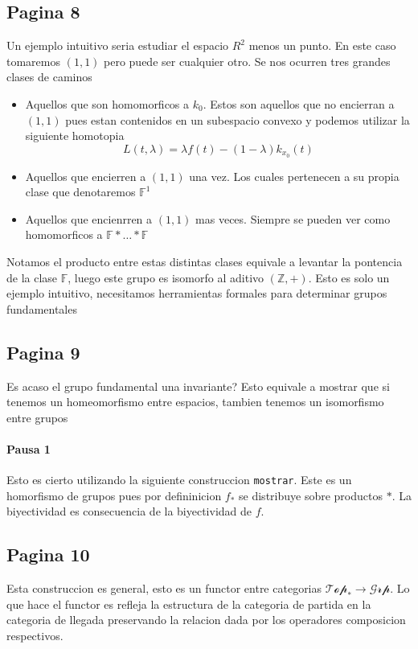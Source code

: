 \documentclass[letterpaper]{article}
\begin{document}
\subsection*{Pagina 8}
Un ejemplo intuitivo seria estudiar el espacio \(R^2\) menos un punto.
En este caso tomaremos \((1,1)\) pero puede ser cualquier otro. Se nos
ocurren tres grandes clases de caminos
\begin{itemize}
\item Aquellos que son homomorficos a \(k_0\). Estos son aquellos que no
  encierran a \((1,1)\) pues estan contenidos en un subespacio convexo y
  podemos utilizar la siguiente homotopia
  \[ L (t,\lambda) = \lambda f (t) - (1 - \lambda) k_{x_0} (t)\]
\item Aquellos que encierren a \((1,1)\) una vez. Los cuales pertenecen
  a su propia clase que denotaremos \(\mathbb F ^1\)
\item Aquellos que encienrren a \((1,1)\) mas veces. Siempre se pueden
  ver como homomorficos a \(\mathbb F * \dots * \mathbb F \)
\end{itemize}
Notamos el producto entre estas distintas clases equivale a levantar la
pontencia de la clase \(\mathbb F\), luego este grupo es isomorfo al
aditivo \((\mathbb Z , +)\). Esto es solo un ejemplo intuitivo,
necesitamos herramientas formales para determinar grupos fundamentales

\subsection*{Pagina 9}
Es acaso el grupo fundamental una invariante? Esto equivale a mostrar
que si tenemos un homeomorfismo entre espacios, tambien tenemos un
isomorfismo entre grupos

\paragraph{Pausa 1}
Esto es cierto utilizando la siguiente construccion \texttt{mostrar}.
Este es un homorfismo de grupos pues por defininicion \(f_*\) se
distribuye sobre productos \(*\). La biyectividad es consecuencia de la
biyectividad de \(f\).

\subsection*{Pagina 10}
Esta construccion es general, esto es un functor entre categorias
\(\mathscr{Top}_* \to \mathscr{Grp}\). Lo que hace el functor es refleja
la estructura de la categoria de partida en la categoria de llegada
preservando la relacion dada por los operadores composicion respectivos.
\end{document}
